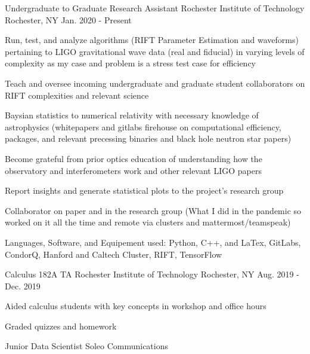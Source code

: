 \begin{cventries}

    \cventry
    {Undergraduate to Graduate Research Assistant}
    {Rochester Institute of Technology}
    {Rochester, NY}
    {Jan. 2020 - Present}
    {
      \begin{cvitems}
        \item {Run, test, and analyze algorithms (RIFT Parameter Estimation and waveforms) pertaining to LIGO gravitational wave data (real and fiducial) in varying levels of complexity as my case and problem is a stress test case for efficiency}
        \item{Teach and oversee incoming undergraduate and graduate student collaborators on RIFT complexities and relevant science}
        \item{Baysian statistics to numerical relativity with necessary knowledge of astrophysics (whitepapers and gitlabs firehouse on computational efficiency, packages, and relevant precessing binaries and black hole neutron star papers)}
        \item{Become grateful from prior optics education of understanding how the observatory and interferometers work and other relevant LIGO papers}
        \item {Report insights and generate statistical plots to the project's research group}
        \item {Collaborator on paper and in the research group (What I did in the pandemic so worked on it all the time and remote via clusters and mattermost/teamspeak)}
        \item {Languages, Software, and Equipement used: Python, C++, and LaTex, GitLabs, CondorQ, Hanford and Caltech Cluster, RIFT, TensorFlow}
      \end{cvitems}
    }
    \cventry
    {Calculus 182A TA}
    {Rochester Institute of Technology}
    {Rochester, NY}
    {Aug. 2019 - Dec. 2019}
    {
      \begin{cvitems}
        \item {Aided calculus students with key concepts in workshop and office hours}
        \item {Graded quizzes and homework}
      \end{cvitems}
    }
  \cventry
    {Junior Data Scientist}
    {Soleo Communications}

\end{cventries}
